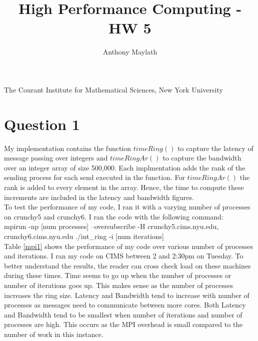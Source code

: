\documentclass{article}
\title{High Performance Computing - HW 5}
\author{Anthony Maylath}
\begin{document}
\maketitle

\begin{center}

The Courant Institute for Mathematical Sciences, New York University \\ 

\end{center}


\setcounter{MaxMatrixCols}{13}

\section{Question 1}

My implementation contains the function $timeRing()$ to capture the latency of message passing over integers and $timeRingAr()$ to capture the bandwidth over an integer array of size 500,000. Each implmentation adds the rank of the sending process for each send executed in the function. For $timeRingAr()$ the rank is added to every element in the array. Hence, the time to compute these increments are included in the latency and bandwidth figures.\\

To test the performance of my code, I ran it with a varying number of processes on crunchy5 and crunchy6. I ran the code with the following command:\\

mpirun -np [num processes] --oversubscribe 
-H crunchy5.cims.nyu.edu, crunchy6.cims.nyu.edu ./int\_ring -i [num iterations]\\

Table \ref{mpi1} shows the performance of my code over various number of processes and iterations. I ran my code on CIMS between 2 and 2:30pm on Tuesday. To better understand the results, the reader can cross check load on these machines during these times. Time seems to go up when the number of processes or number of iterations goes up. This makes sense as the number of processes increases the ring size. Latency and Bandwidth tend to increase with number of processes as messages need to communicate between more cores. Both Latency and Bandwidth tend to be smallest when number of iterations and number of processes are high. This occurs as the MPI overhead is small compared to the number of work in this instance.
\end{document}
